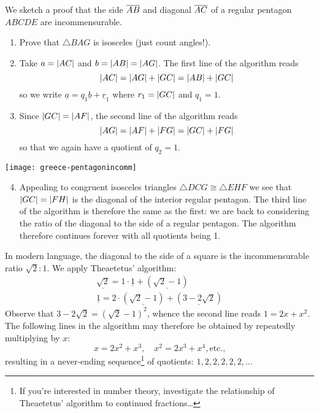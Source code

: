 \goodbreak

\label{ex:theaetetus} We sketch a proof that the side $\overline{AB}$ and diagonal $\overline{AC}$ of a regular pentagon $ABCDE$ are incommensurable.\par
\begin{minipage}[t]{0.65\linewidth}\vspace{-5pt}
	\begin{enumerate}\itemsep0pt
	  \item Prove that $\triangle BAG$ is isosceles (just count angles!).
	  \item Take $a=\left| AC\right|$ and $b=\left| AB\right|=\left| AG\right|$. The first line of the algorithm reads
	  \[
	  	\left| AC\right|=\left| AG\right|+\left| GC\right|=\left| AB\right|+\left| GC\right|
	  \]
	  so we write $\underline a=q_1\underline b+\underline r_1$ where $r_1=\left| GC\right|$ and $q_1=1$.
	  \item Since $\left| GC\right|=\left| AF\right|$, the second line of the algorithm reads
	  \[
	  	\left| AG\right|=\left| AF\right|+\left| FG\right|=\left| GC\right|+\left| FG\right|
	  \]
	  so that we again have a quotient of $q_2=1$.
	\end{enumerate}
\end{minipage}
\hfill
\begin{minipage}[t]{0.34\textwidth}\vspace{-5pt}
	\flushright
	\texttt{[image: greece-pentagonincomm]}
\end{minipage}
	
	
\begin{enumerate}\setcounter{enumi}{3}
	\item Appealing to congruent isosceles triangles $\triangle DCG\cong\triangle EHF$ we see that $\left| GC\right|=\left| FH\right|$ is the diagonal of the interior regular pentagon. The third line of the algorithm is therefore the same as the first: we are back to considering the ratio of the diagonal to the side of a regular pentagon. The algorithm therefore continues forever with all quotients being 1.
\end{enumerate}



In modern language, the diagonal to the side of a square is the incommensurable ratio $\sqrt 2:1$. We apply Theaetetus' algorithm:
\begin{gather*}
	\underline{\sqrt 2}=1\cdot \underline 1+(\underline{\sqrt 2-1})\\
	\underline 1=2\cdot(\underline{\sqrt 2-1})+(\underline{3-2\sqrt 2})
\end{gather*}
Observe that $3-2\sqrt 2=(\sqrt 2-1)^2$, whence the second line reads $1=2x+x^2$. The following lines in the algorithm may therefore be obtained by repeatedly multiplying by $x$:
\[
	x=2x^2+x^3,\quad x^2=2x^3+x^4,\text{etc.,}
\]
resulting in a never-ending sequence\footnote{%
If you're interested in number theory, investigate the relationship of Theaetetus' algorithm to continued fractions\ldots%
} of quotients: $1,2,2,2,2,2,\ldots$
	

